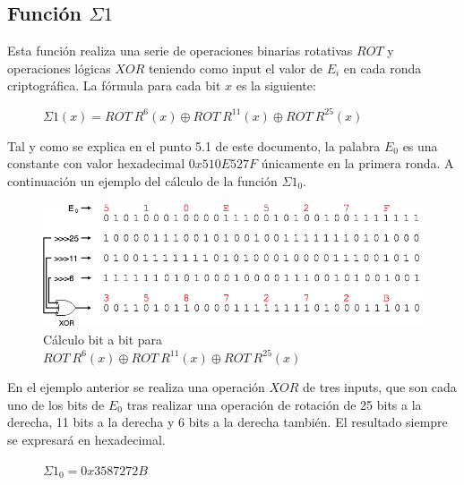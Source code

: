 \documentclass{article}
\begin{document}
    \subsection{Función $\Sigma1$}
        Esta función realiza una serie de operaciones binarias rotativas $ROT$ y operaciones lógicas $XOR$ teniendo como input el valor de $E_{i}$ en cada ronda criptográfica. La fórmula para cada bit $x$ es la siguiente:
            \begin{figure}[H]
            \centering
                $\Sigma1(x) = ROT \ R^{6}(x) \oplus ROT \ R^{11}(x) \oplus ROT \ R^{25}(x)$
            \end{figure}
        Tal y como se explica en el punto 5.1 de este documento, la palabra $E_{0}$ es una constante con valor hexadecimal $0x510E527F$ únicamente en la primera ronda. A continuación un ejemplo del cálculo de la función $\Sigma1_{0}$.
            \begin{figure}[H]
            \centering
                \includegraphics[scale=0.41]{img/SHA-256-function_Sigma1.png}
                \caption{Cálculo bit a bit para $ROT \ R^{6}(x) \oplus ROT \ R^{11}(x) \oplus ROT \ R^{25}(x)$}
            \end{figure}
        En el ejemplo anterior se realiza una operación $XOR$ de tres inputs, que son cada uno de los bits de $E_{0}$ tras realizar una operación de rotación de 25 bits a la derecha, 11 bits a la derecha y 6 bits a la derecha también. El resultado siempre se expresará en hexadecimal.
            \begin{figure}[H]
            \centering
                $\Sigma1_{0} = 0x3587272B$
            \end{figure}
        
\end{document}
